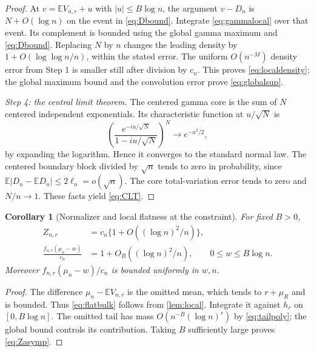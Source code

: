 \documentclass[11pt,oneside]{article}
\numberwithin{equation}{section}
\theoremstyle{plain}
\newtheorem{corollary}[theorem]{Corollary}
\theoremstyle{definition}
\theoremstyle{remark}
\newcommand{\E}{\mathbb E}
\begin{document}
\begin{proof}
At $v=\E V_{n,r}+u$ with $|u|\le B\log n$, the argument
$v-D_n$ is $N+O(\log n)$ on the event in \eqref{eq:Dbound}.
Integrate \eqref{eq:gammalocal} over that event. Its complement is
bounded using the global gamma maximum and \eqref{eq:Dbound}.
Replacing $N$ by $n$ changes the leading density by
$1+O(\log\log n/n)$, within the stated error. The uniform
$O(n^{-M})$ density error from Step 1 is smaller still after division
by $c_n$. This proves \eqref{eq:localdensity}; the global maximum
bound and the convolution error prove \eqref{eq:globalsup}.

\emph{Step 4: the central limit theorem.}
The centered gamma core is the sum of $N$ centered independent
exponentials. Its characteristic function at $u/\sqrt N$ is
\[
 \left(\frac{e^{-iu/\sqrt N}}{1-iu/\sqrt N}\right)^N
 \longrightarrow e^{-u^2/2},
\]
by expanding the logarithm. Hence it converges to the standard
normal law. The centered boundary block divided by $\sqrt n$
tends to zero in probability, since
$\E|D_n-\E D_n|\le2\ell_n=o(\sqrt n)$.
The core total-variation error tends to zero and $N/n\to1$.
These facts yield \eqref{eq:CLT}.
\end{proof}

\begin{corollary}[Normalizer and local flatness at the constraint]
\label{cor:normalizer}
For fixed $B>0$,
\begin{align}
 Z_{n,r}&=c_n\{1+O((\log n)^2/n)\},\label{eq:Zasymp}\\
 \frac{f_{n,r}(\mu_n-w)}{c_n}
   &=1+O_B((\log n)^2/n),\qquad 0\le w\le B\log n.
 \label{eq:flatbulk}
\end{align}
Moreover $f_{n,r}(\mu_n-w)/c_n$ is bounded uniformly in $w,n$.
\end{corollary}
\begin{proof}
The difference $\mu_n-\E V_{n,r}$ is the omitted mean, which tends
to $r+\mu_R$ and is bounded. Thus \eqref{eq:flatbulk} follows from
\cref{lem:local}. Integrate it against $h_r$ on $[0,B\log n]$.
The omitted tail has mass $O(n^{-B}(\log n)^r)$ by
\eqref{eq:tailpoly}; the global bound controls its contribution.
Taking $B$ sufficiently large proves \eqref{eq:Zasymp}.
\end{proof}
\end{document}
